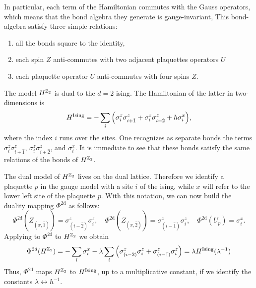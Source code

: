 In particular, each term of the Hamiltonian commutes with the Gauss operators, which means that the bond algebra they generate is gauge-invariant,
This bond-algebra satisfy three simple relations:
\begin{enumerate}[label=(\roman*)]
    \item all the bonds square to the identity,
    \item each spin $Z$ anti-commutes with two adjacent plaquettes operators $U$
    \item each plaquette operator $U$ anti-commutes with four spins $Z$.
\end{enumerate}

The model $H^{\mathbb{Z}_2}$ is dual to the $d=2$ \ac{ising}.
The Hamiltonian of the latter in two-dimensions is
\begin{equation}
    H^{\text{Ising}} =
    - \sum_{i} \qty(
        \sigma^z_i \sigma^z_{i+\hat{1}} +
        \sigma^z_i \sigma^z_{i+\hat{2}} +
        h \sigma^x_i
    ),
\end{equation}
where the index $i$ runs over the sites.
One recognizes as separate bonds the terms $\sigma^z_i \sigma^z_{i+\hat{1}}$, $\sigma^z_i \sigma^z_{i+\hat{2}}$, and $\sigma^x_i$.
It is immediate to see that these bonds satisfy the same relations of the bonds of $H^{\mathbb{Z}_2}$.

The dual model of $H^{\mathbb{Z}_2}$ lives on the dual lattice.
Therefore we identify a plaquette $p$ in the gauge model with a site $i$ of the \ac{ising}, while $x$ will refer to the lower left site of the plaquette $p$.
With this notation, we can now build the duality mapping $\Phi^{\text{2d}}$ as follows:
\begin{equation}
    \Phi^{\text{2d}}(Z_{(x, \hat{1})} )  = \sigma^z_{(i-\hat{2})} \sigma^z_i, \quad
    \Phi^{\text{2d}}(Z_{(x, \hat{2})} )  = \sigma^z_{(i-\hat{1})} \sigma^z_i, \quad
    \Phi^{\text{2d}}(U_p) = \sigma^x_i.
    \label{eq:duality_2d}
\end{equation}
Applying to $\Phi^{\text{2d}}$ to $H^{\mathbb{Z}_2}$ we obtain
\begin{equation}
    \Phi^{2d} (H^{\mathbb{Z}_2}) =
    - \sum_{i} \sigma^x_i - \lambda \sum_{i} \qty(
        \sigma^z_{(i-\hat{2})} \sigma^z_i +
        \sigma^z_{(i-\hat{1})} \sigma^z_i
    ) =
    \lambda H^{\text{Ising}}(\lambda^{-1})
\end{equation}
Thus, $\Phi^{\text{2d}}$ maps $H^{\mathbb{Z}_2}$ to $H^{\text{Ising}}$, up to a multiplicative constant, if we identify the constants $\lambda \leftrightarrow h^{-1}$.

